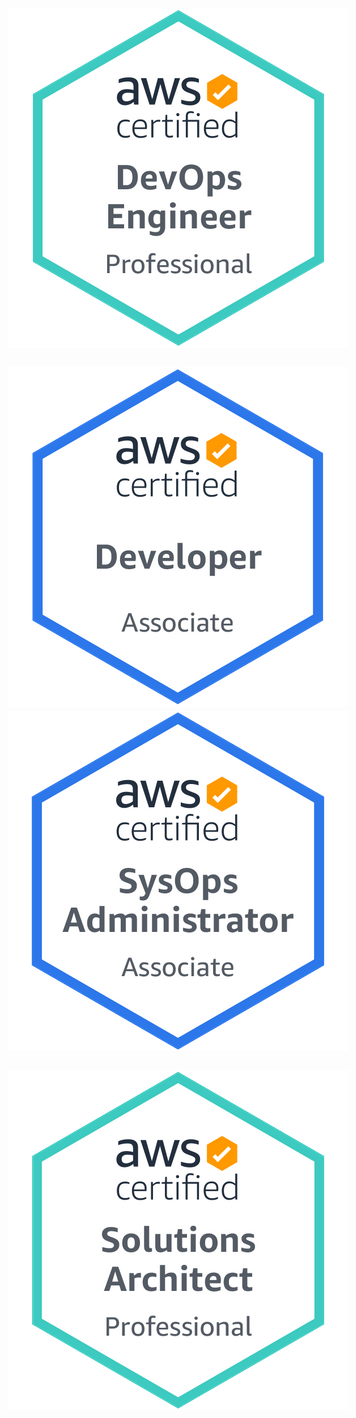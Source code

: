 \documentclass[]{cv-a4}
\begin{document}
\begin{multicols}{3}
  \begin{center}
    \includegraphics[width=0.45\linewidth]{images/AWS-DevOpsEngineer-Professional-2020.png}
    
    \includegraphics[width=0.45\linewidth]{images/AWS-Developer-Associate-2020.png}
    \includegraphics[width=0.45\linewidth]{images/AWS-SysOpAdmin-Associate-2020.png}
  \end{center}
  \vfill\null

  \columnbreak

  \begin{center}
    \includegraphics[width=0.45\linewidth]{images/AWS-SolArchitect-Professional-2020.png}


\end{center}
\end{multicols}
\end{document}

